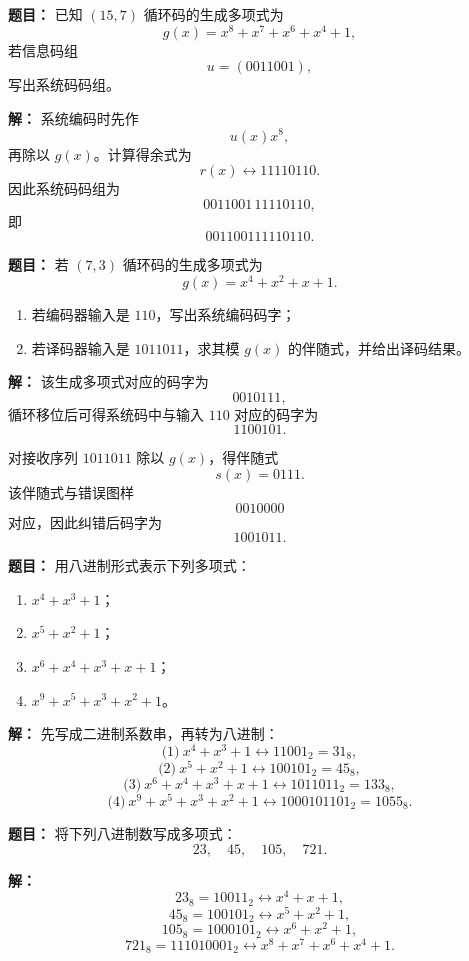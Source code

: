 \medskip
{}
\textbf{题目：}
已知 $(15,7)$ 循环码的生成多项式为
\[
g(x)=x^8+x^7+x^6+x^4+1,
\]
若信息码组
\[
u=(0011001),
\]
写出系统码码组。

\par\textbf{解：}
系统编码时先作
\[
u(x)x^8,
\]
再除以 $g(x)$。计算得余式为
\[
r(x)\leftrightarrow 11110110.
\]
因此系统码码组为
\[
0011001\,11110110,
\]
即
\[
001100111110110.
\]

\medskip
{}
\textbf{题目：}
若 $(7,3)$ 循环码的生成多项式为
\[
g(x)=x^4+x^2+x+1.
\]
\begin{enumerate}
\item 若编码器输入是 $110$，写出系统编码码字；
\item 若译码器输入是 $1011011$，求其模 $g(x)$ 的伴随式，并给出译码结果。
\end{enumerate}

\par\textbf{解：}
该生成多项式对应的码字为
\[
0010111,
\]
循环移位后可得系统码中与输入 $110$ 对应的码字为
\[
1100101.
\]

对接收序列 $1011011$ 除以 $g(x)$，得伴随式
\[
s(x)=0111.
\]
该伴随式与错误图样
\[
0010000
\]
对应，因此纠错后码字为
\[
1001011.
\]

\medskip
{}
\textbf{题目：}
用八进制形式表示下列多项式：
\begin{enumerate}
\item $x^4+x^3+1$；
\item $x^5+x^2+1$；
\item $x^6+x^4+x^3+x+1$；
\item $x^9+x^5+x^3+x^2+1$。
\end{enumerate}

\par\textbf{解：}
先写成二进制系数串，再转为八进制：
\[
\text{(1)}\ x^4+x^3+1 \leftrightarrow 11001_2=31_8,
\]
\[
\text{(2)}\ x^5+x^2+1 \leftrightarrow 100101_2=45_8,
\]
\[
\text{(3)}\ x^6+x^4+x^3+x+1 \leftrightarrow 1011011_2=133_8,
\]
\[
\text{(4)}\ x^9+x^5+x^3+x^2+1 \leftrightarrow 1000101101_2=1055_8.
\]

\medskip
{}
\textbf{题目：}
将下列八进制数写成多项式：
\[
23,\quad 45,\quad 105,\quad 721.
\]

\par\textbf{解：}
\[
23_8=10011_2 \leftrightarrow x^4+x+1,
\]
\[
45_8=100101_2 \leftrightarrow x^5+x^2+1,
\]
\[
105_8=1000101_2 \leftrightarrow x^6+x^2+1,
\]
\[
721_8=111010001_2 \leftrightarrow x^8+x^7+x^6+x^4+1.
\]

